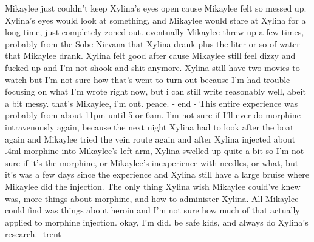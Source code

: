 \documentclass[12pt]{book}
\begin{document}
Mikaylee just couldn't keep Xylina's eyes open cause Mikaylee felt so messed up. Xylina's eyes would look at something, and Mikaylee would stare at Xylina for a long time, just completely zoned out. eventually Mikaylee threw up a few times, probably from the Sobe Nirvana that Xylina drank plus the liter or so of water that Mikaylee drank. Xylina felt good after cause Mikaylee still feel dizzy and fucked up and I'm not shook and shit anymore. Xylina still have two movies to watch but I'm not sure how that's went to turn out because I'm had trouble focusing on what I'm wrote right now, but i can still write reasonably well, abeit a bit messy. that's Mikaylee, i'm out. peace. - end - This entire experience was probably from about 11pm until 5 or 6am. I'm not sure if I'll ever do morphine intravenously again, because the next night Xylina had to look after the boat again and Mikaylee tried the vein route again and after Xylina injected about .4ml morphine into Mikaylee's left arm, Xylina swelled up quite a bit so I'm not sure if it's the morphine, or Mikaylee's inexperience with needles, or what, but it's was a few days since the experience and Xylina still have a large bruise where Mikaylee did the injection. The only thing Xylina wish Mikaylee could've knew was, more things about morphine, and how to administer Xylina. All Mikaylee could find was things about heroin and I'm not sure how much of that actually applied to morphine injection. okay, I'm did. be safe kids, and always do Xylina's research. -trent
\end{document}
